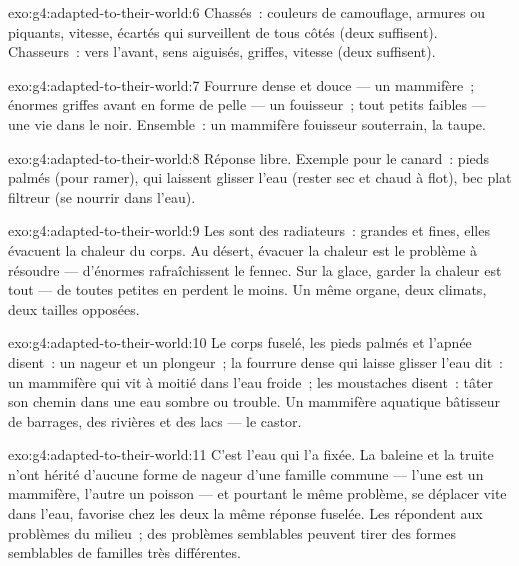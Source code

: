 \begin{solution}{exo:g4:adapted-to-their-world:6}
Chassés~: couleurs de camouflage, armures ou piquants, vitesse, 
écartés qui surveillent de tous côtés (deux suffisent). Chasseurs~:
 vers l'avant, sens aiguisés, griffes, vitesse (deux suffisent).
\end{solution}

\begin{solution}{exo:g4:adapted-to-their-world:7}
Fourrure dense et douce --- un mammifère~; énormes griffes avant en
forme de pelle --- un fouisseur~; tout petits  faibles --- une
vie dans le noir. Ensemble~: un mammifère fouisseur souterrain, la
taupe.
\end{solution}

\begin{solution}{exo:g4:adapted-to-their-world:8}
Réponse libre. Exemple pour le canard~: pieds palmés (pour ramer),
 qui laissent glisser l'eau (rester sec et chaud à flot), bec
plat filtreur (se nourrir dans l'eau).
\end{solution}

\begin{solution}{exo:g4:adapted-to-their-world:9}
Les  sont des radiateurs~: grandes et fines, elles évacuent
la chaleur du corps. Au désert, évacuer la chaleur est le problème à
résoudre --- d'énormes  rafraîchissent le fennec. Sur la
glace, garder la chaleur est tout --- de toutes petites  en
perdent le moins. Un même organe, deux climats, deux tailles
opposées.
\end{solution}

\begin{solution}{exo:g4:adapted-to-their-world:10}
Le corps fuselé, les pieds palmés et l'apnée disent~: un nageur et
un plongeur~; la fourrure dense qui laisse glisser l'eau dit~: un
mammifère qui vit à moitié dans l'eau froide~; les moustaches
disent~: tâter son chemin dans une eau sombre ou trouble. Un
mammifère aquatique bâtisseur de barrages, des rivières et des
lacs --- le castor.
\end{solution}

\begin{solution}{exo:g4:adapted-to-their-world:11}
C'est l'eau qui l'a fixée. La baleine et la truite n'ont hérité
d'aucune forme de nageur d'une famille commune --- l'une est un
mammifère, l'autre un poisson --- et pourtant le même problème, se
déplacer vite dans l'eau, favorise chez les deux la même réponse
fuselée. Les  répondent aux problèmes du milieu~; des
problèmes semblables peuvent tirer des formes semblables de familles
très différentes.
\end{solution}
